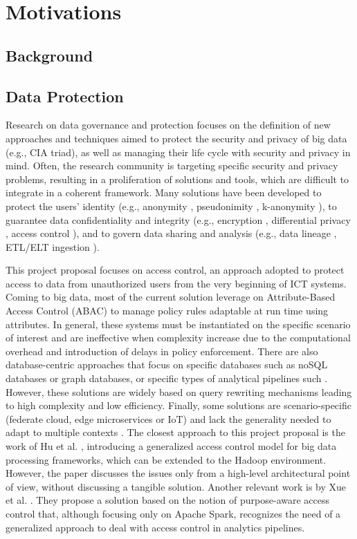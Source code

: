 \section{Motivations}
\subsection{Background}
\subsection{Data Protection}
Research on data governance and protection focuses on the definition of new approaches and techniques aimed to protect the security and privacy of big data (e.g., CIA triad), as well as managing their life cycle with security and privacy in mind. Often, the research community is targeting specific security and privacy problems, resulting in a proliferation of solutions and tools, which are difficult to integrate in a coherent framework. Many solutions have been developed to protect the users' identity (e.g., anonymity \cite{wallace1999anonymity}, pseudonimity \cite{pfitzmann2001pseudonymity}, k-anonymity \cite{k-anon}), to guarantee data confidentiality and integrity (e.g., encryption \cite{thambiraja2012survey}, differential privacy \cite{hassan2019differential}, access control \cite{tolone2005access,servos2017current}), and to govern data sharing and analysis (e.g., data lineage \cite{woodruff1997supporting}, ETL/ELT ingestion \cite{vassiliadis2009survey}).

This project proposal focuses on access control, an approach adopted to protect access to data from unauthorized users from the very beginning of ICT systems. Coming to big data, most of the current solution leverage on Attribute-Based Access Control (ABAC) \cite{NIST:ABAC:2014} to manage policy rules adaptable at run time using attributes. In general, these systems must be instantiated on the specific scenario of interest and are ineffective when complexity increase due to the computational overhead and introduction of delays in policy enforcement. There are also database-centric approaches that focus on specific databases such as noSQL databases or graph databases, or specific types of analytical pipelines such \cite{AConGraphDB:2021, AConMongoDB:2022, ABACforHBase:2019}. However, these solutions are widely based on query rewriting mechanisms leading to high complexity and low efficiency. Finally, some solutions are scenario-specific (federate cloud, edge microservices or IoT) and lack the generality needed to adapt to multiple contexts \cite{MultipartyAC:2019, IoTSecurity}.
The closest approach to this project proposal is the work of Hu et al. \cite{ HUFerraiolo:2014}, introducing a generalized access control model for big data processing frameworks, which can be extended to the Hadoop environment. However, the paper discusses the issues only from a high-level architectural point of view, without discussing a tangible solution. Another relevant work is by Xue et al. \cite{GuardSpark:ACSAC:2020}. They propose a solution based on the notion of purpose-aware access control \cite{Byun2008} that, although focusing only on Apache Spark, recognizes the need of a generalized approach to deal with access control in analytics pipelines.

